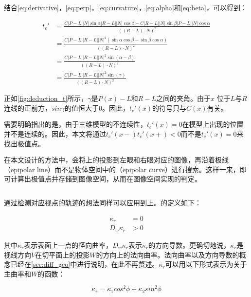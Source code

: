 结合\autoref{eq:derivative}，\autoref{eq:perp}，\autoref{eq:curvature}，\autoref{eq:alpha}和\ref{eq:beta}，可以得到：

\begin{equation}\label{eq:final}
\begin{split}
t_c' & = \frac{C|P-L||N|\sin\alpha|R-L||N|\cos\beta-C|R-L||N|\sin\beta|P-L||N|\cos\alpha}{((R-L)\cdot{N})^2} \\
& = \frac{C|P-L||R-L||N|^2(\sin\alpha\cos\beta-\sin\beta\cos\alpha)}{((R-L)\cdot{N})^2} \\
& = \frac{C|P-L||R-L||N|^2\sin(\alpha-\beta)}{((R-L)\cdot{N})^2} \\
& = \frac{C|P-L||R-L||N|^2\sin(\gamma)}{((R-L)\cdot{N})^2}
\end{split}
\end{equation}

正如\autoref{fig:deduction_t}所示，$\gamma$是$P(x)-L$和$R-L$之间的夹角。由于$x$ 位于$L$与$R$连线的正前方，$sin\gamma$的值恒大于0。因此，$t_c'(x)$的符号只与$C(x)$有关。

需要明确指出的是，由于三维模型的不连续性，$t_c'(x)=0$在模型上出现的位置并不是连续的。因此，本文将通过$t_c'(x-)t_c'(x+) < 0$而不是$t_c'(x)=0$来找出极值点。

在本文设计的方法中，会将\ec{}上的\conp{}投影到左眼和右眼对应的图像，再沿着极线（epipolar line）而不是物体空间中的\ec{}（epipolar curve）进行搜索。这样一来，即可计算出极值点并存储到图像空间，从而在图像空间实现\epsl{}的判定。

\subsection{\scon{}}
\label{sec:suggestive_contour_math}
通过检测对应视点的轨迹的想法同样可以应用到\scon{}上。\scon{}的定义如下：

\begin{align}
  \kappa_r &= 0 \label{eq:Kr} \\
  D_w\kappa_r &> 0 \label{eq:DwKr} 
\end{align}

其中$\kappa_r$表示表面上一点的径向曲率，$D_w\kappa_r$表示$\kappa_r$的方向导数。更确切地说，$\kappa_r$是视线方向$V$在切平面上的投影$W$的方向上的法向曲率。法向曲率以及方向导数的概念已经在\autoref{sec:diff_geo}中进行说明，在此不再赘述。$\kappa_r$可以用以下形式表示为关于主曲率和$W$的函数：

\begin{equation}\label{eq:normal curvature}
    \kappa_r = \kappa_1cos^2\phi+\kappa_2sin^2\phi
\end{equation}

